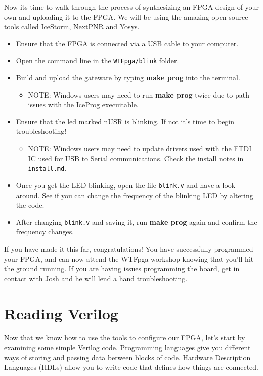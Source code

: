 \documentclass[12pt,a4paper]{article}
\begin{document}
\noindent
Now its time to walk through the process of synthesizing an FPGA design of your own and uploading it to the FPGA. We will be using the amazing open source tools called IceStorm, NextPNR and Yosys. 
\begin{itemize}
		\item Ensure that the FPGA is connected via a USB cable to your computer. 
		\item Open the command line in the \texttt{WTFpga/blink} folder.
		\item Build and upload the gateware by typing \textbf{make prog} into the terminal. 
			\begin{itemize}
				\item NOTE: Windows users may need to run \textbf{make prog} twice due to path issues with the IceProg execuitable. 
			\end{itemize}
		\item Ensure that the led marked nUSR is blinking. If not it's time to begin troubleshooting!
			\begin{itemize}
				\item NOTE: Windows users may need to update drivers used with the FTDI IC used for USB to Serial communications. Check the install notes in \texttt{install.md}.
			\end{itemize}
		\item Once you get the LED blinking, open the file \texttt{blink.v} and have a look around. See if you can change the frequency of the blinking LED by altering the code. 
		\item After changing \texttt{blink.v} and saving it, run \textbf{make prog} again and confirm the frequency changes. 
\end{itemize}
If you have made it this far, congratulations! You have successfully programmed your FPGA, and can now attend the WTFpga workshop knowing that you'll hit the ground running. If you are having issues programming the board, get in contact with Josh and he will lend a hand troubleshooting. 
\newpage
\section{Reading Verilog}
Now that we know how to use the tools to configure our FPGA, let’s start by examining some simple Verilog code. Programming languages give you different ways of storing and passing data between blocks of code. Hardware Description Languages (HDLs) allow you to write code that defines how things are connected. 
\end{document}
